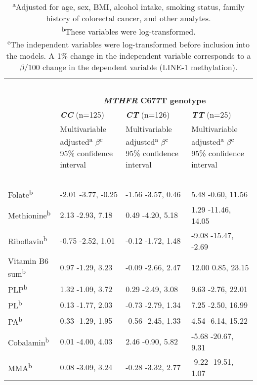 \begin{table}
\small
\caption{Associations between plasma B vitamins and LINE-1 methylation according to \emph{MTHFR} C677T genotype.}
\label{table5_4}
\begin{adjustbox}{width=\textwidth}
\begin{tabular}{L{2.3cm}C{3.7cm}C{3.7cm}C{3.5cm}}

\hline
~ & ~ & ~ & ~ \\
 ~ & \\ ~ & \textbf{\textit{CC}} (n=125) & \textbf{\textit{CT}} (n=126) & \textbf{\textit{TT}} (n=25)\\
~ & { Multivariable adjusted\textsuperscript{a}}{ $\beta $\textsuperscript{c}}
95\% confidence interval & { Multivariable adjusted\textsuperscript{a}}{ $\beta $\textsuperscript{c}}
95\% confidence interval & { Multivariable adjusted\textsuperscript{a}}{ $\beta $\textsuperscript{c}}
95\% confidence interval\\
~ & ~ & ~ & ~ \\
\hline
 Folate\textsuperscript{b} & { {}-2.01} {}-3.77, -0.25 & { {}-1.56} {}-3.57, 0.46 & { 5.48} {}-0.60, 11.56\\
 Methionine\textsuperscript{b} & { 2.13} {}-2.93, 7.18 & { 0.49} {}-4.20, 5.18 & { 1.29} {}-11.46, 14.05\\
 Riboflavin\textsuperscript{b} & { {}-0.75} {}-2.52, 1.01 & { {}-0.12} {}-1.72, 1.48 & { {}-9.08} {}-15.47, -2.69\\
 Vitamin B6 sum\textsuperscript{b} & { 0.97} {}-1.29, 3.23 & { {}-0.09} {}-2.66, 2.47 & { 12.00} 0.85, 23.15\\
 PLP\textsuperscript{b} & { 1.32} {}-1.09, 3.72 & { 0.29} {}-2.49, 3.08 & { 9.63} {}-2.76, 22.01\\
 PL\textsuperscript{b} & { 0.13} {}-1.77, 2.03 & { {}-0.73} {}-2.79, 1.34 & { 7.25} {}-2.50, 16.99\\
 PA\textsuperscript{b} & { 0.33} {}-1.29, 1.95 & { {}-0.56} {}-2.45, 1.33 & { 4.54} {}-6.14, 15.22\\
 Cobalamin\textsuperscript{b} & { 0.01} {}-4.00, 4.03 & { 2.46} {}-0.90, 5.82 & { {}-5.68} {}-20.67, 9.31\\
 MMA\textsuperscript{b} & { 0.08} {}-3.09, 3.24 & { {}-0.28} {}-3.32, 2.77 & { {}-9.22} {}-19.51, 1.07\\
\hline
\end{tabular}
\end{adjustbox}
\caption*{\footnotesize{\textsuperscript{a}Adjusted for age, sex, BMI, alcohol intake, smoking status, family history of colorectal cancer, and other analytes.\\\textsuperscript{b}These variables were log-transformed.\\\textsuperscript{c}The independent variables were log-transformed before inclusion into the models. A 1\% change in the independent variable corresponds to a $\beta$/100 change in the dependent variable (LINE-1 methylation).}}
\end{table}


